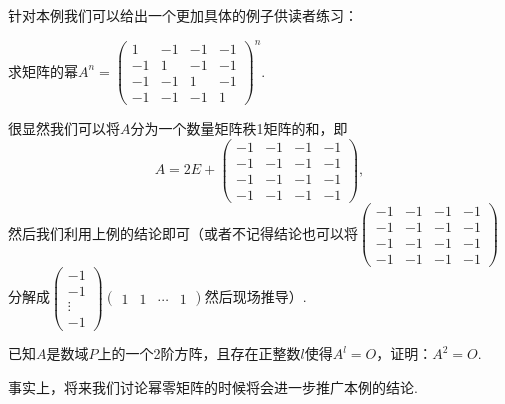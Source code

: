 \begin{enumerate}
          针对本例我们可以给出一个更加具体的例子供读者练习：
          \begin{example}{}{}
              求矩阵的幂$A^n=\begin{pmatrix}
                      1  & -1 & -1 & -1 \\
                      -1 & 1  & -1 & -1 \\
                      -1 & -1 & 1  & -1 \\
                      -1 & -1 & -1 & 1
                  \end{pmatrix}^n$.
          \end{example}
          \begin{solution}
              很显然我们可以将$A$分为一个数量矩阵秩1矩阵的和，即\[A=2E+\begin{pmatrix}
                      -1 & -1 & -1 & -1 \\
                      -1 & -1 & -1 & -1 \\
                      -1 & -1 & -1 & -1 \\
                      -1 & -1 & -1 & -1
                  \end{pmatrix},\]
              然后我们利用上例的结论即可（或者不记得结论也可以将$\begin{pmatrix}
                      -1 & -1 & -1 & -1 \\
                      -1 & -1 & -1 & -1 \\
                      -1 & -1 & -1 & -1 \\
                      -1 & -1 & -1 & -1
                  \end{pmatrix}$分解成$\begin{pmatrix}
                      -1 \\ -1 \\ \vdots \\ -1
                  \end{pmatrix}\begin{pmatrix}
                      1 & 1 & \cdots & 1
                  \end{pmatrix}$然后现场推导）.
          \end{solution}

          \begin{example}{}{}
              已知$A$是数域$P$上的一个2阶方阵，且存在正整数$l$使得$A^l=O$，证明：$A^2=O$.
          \end{example}
          事实上，将来我们讨论幂零矩阵的时候将会进一步推广本例的结论.


\end{enumerate}
